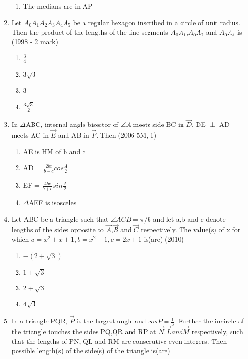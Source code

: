 \documentclass[journal,12pt,twocolumn]{IEEEtran}
\theoremstyle{remark}
\begin{document}
\begin{enumerate}
\begin{enumerate}
    \item The medians are in AP
    \end{enumerate}
    \item Let $A_{0}A_{1}A_{2}A_{3}A_{4}A_{5}$ be a regular hexagon inscribed in a circle of unit radius. Then the product of the lengths of the line segments $A_{0}A_{1}$,$A_{0}A_{2}$ and $A_{0}A_{4}$ is 
    \hfill{(1998 - 2 mark)}
    \begin{multicols}{2}
    \begin{enumerate}
    \item ${\frac{3}{4}}$
    \item $3\sqrt{3}$
    \item 3
    \item ${\frac{3\sqrt{3}}{2}}$
    \end{enumerate}
    \end{multicols}
    \item In $\Delta$ABC, internal angle bisector of $\angle A$ meets side BC in $\vec{D}$. DE $\perp$ AD meets AC in $\vec{E}$ and AB in $\vec{F}$. Then
    \hfill{(2006-5M,-1)}
    \begin{enumerate}
    \item AE is HM of b and c
    \item AD = ${\frac{2bc}{b+c}}cos{\frac{A}{2}}$
    \item EF = ${\frac{4bc}{b+c}}sin{\frac{A}{2}}$
    \item $\Delta$AEF is isosceles
    \end{enumerate}
    \item Let ABC be a triangle such that $\angle ACB = \pi/6$ and let a,b and c denote lengths of the sides opposite to $\vec{A}$,$\vec{B}$ and $\vec{C}$ respectively. The value(s) of x for which $a = x^{2}+x+1, b = x^{2}-1, c = 2x+1$ is(are)
    \hfill{(2010)}
    \begin{multicols}{2}
    \begin{enumerate}
    \item $-(2+\sqrt{3})$
    \item $1+\sqrt{3}$
    \item $2+\sqrt{3}$
    \item $4\sqrt{3}$
    \end{enumerate}
    \end{multicols}
    \item In a triangle PQR, $\vec{P}$ is the largest angle and $cosP = \frac{1}{3}$. Further the incircle of the triangle touches the sides PQ,QR and RP at $\vec{N},\vec{L} and \vec{M}$ respectively, such that the lengths of PN, QL and RM are consecutive even integers. Then possible length(s) of the side(s) of the triangle is(are)

\end{enumerate}
\end{document}
